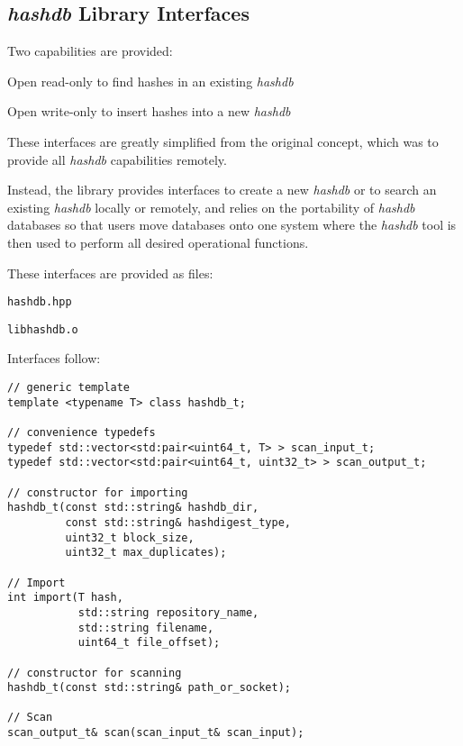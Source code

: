 \documentclass[12pt,twoside]{article}
\newcommand{\hdb}{\emph{hashdb}\xspace}
\begin{document}
\subsection{\hdb Library Interfaces}
Two capabilities are provided:
\begin{compactitem}
\item Open read-only to find hashes in an existing \hdb
\item Open write-only to insert hashes into a new \hdb
\end{compactitem}

These interfaces are greatly simplified from the original concept,
which was to provide all \hdb capabilities remotely.

Instead, the library provides interfaces to create a new \hdb
or to search an existing \hdb locally or remotely,
and relies on the portability of \hdb databases
so that users move databases onto one system
where the \hdb tool is then used
to perform all desired operational functions.

These interfaces are provided as files:
\begin{compactitem}
\item \texttt{hashdb.hpp}
\item \texttt{libhashdb.o}
\end{compactitem}

Interfaces follow:

\begin{small}
\begin{verbatim}
// generic template
template <typename T> class hashdb_t;

// convenience typedefs
typedef std::vector<std:pair<uint64_t, T> > scan_input_t;
typedef std::vector<std:pair<uint64_t, uint32_t> > scan_output_t;

// constructor for importing
hashdb_t(const std::string& hashdb_dir,
         const std::string& hashdigest_type,
         uint32_t block_size,
         uint32_t max_duplicates);

// Import
int import(T hash,
           std::string repository_name,
           std::string filename,
           uint64_t file_offset);

// constructor for scanning
hashdb_t(const std::string& path_or_socket);

// Scan
scan_output_t& scan(scan_input_t& scan_input);
\end{verbatim}
\end{small}
\end{document}
